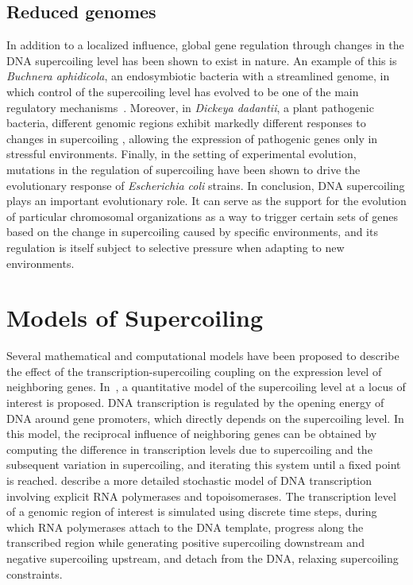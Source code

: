 \subsection{Reduced genomes}
In addition to a localized influence, global gene regulation through changes in the DNA supercoiling level has been shown to exist in nature.
An example of this is \emph{Buchnera aphidicola}, an endosymbiotic bacteria with a streamlined genome, in which control of the supercoiling level has evolved to be one of the main regulatory mechanisms~\citep{brinza2013}.
Moreover, in \emph{Dickeya dadantii}, a plant pathogenic bacteria, different genomic regions exhibit markedly different responses to changes in supercoiling \citep{muskhelishvili2019}, allowing the expression of pathogenic genes only in stressful environments.
Finally, in the setting of experimental evolution, mutations in the regulation of supercoiling have been shown to drive the evolutionary response of \emph{Escherichia coli} strains.
In conclusion, DNA supercoiling plays an important evolutionary role.
It can serve as the support for the evolution of particular chromosomal organizations as a way to trigger certain sets of genes based on the change in supercoiling caused by specific environments, and its regulation is itself subject to selective pressure when adapting to new environments.

\section{Models of Supercoiling}

Several mathematical and computational models have been proposed to describe the effect of the transcription-supercoiling coupling on the expression level of neighboring genes.
In~\cite{meyer2014}, a quantitative model of the supercoiling level at a locus of interest is proposed.
DNA transcription is regulated by the opening energy of DNA around gene promoters, which directly depends on the supercoiling level.
In this model, the reciprocal influence of neighboring genes can be obtained by computing the difference in transcription levels due to supercoiling and the subsequent variation in supercoiling, and iterating this system until a fixed point is reached.
\cite{elhoudaigui2019} describe a more detailed stochastic model of DNA transcription involving explicit RNA polymerases and topoisomerases.
The transcription level of a genomic region of interest is simulated using discrete time steps, during which RNA polymerases attach to the DNA template, progress along the transcribed region while generating positive supercoiling downstream and negative supercoiling upstream, and detach from the DNA, relaxing supercoiling constraints.

